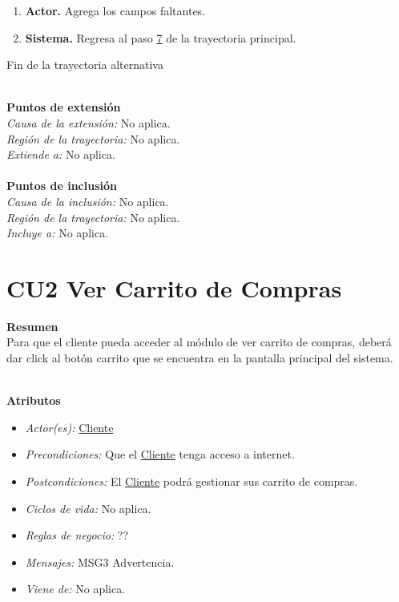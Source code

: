 \begin{itemize}
\begin{enumerate}
				\item \textbf{Actor.} Agrega los campos faltantes.
				
				\item \textbf{Sistema.} Regresa al paso \hyperlink{CU1:TP:P7}{7} de la trayectoria principal.
	
			\end{enumerate}
			
			Fin de la trayectoria alternativa
		

	\end{itemize}

	\noindent \textbf{\\Puntos de extensión}\\

		\noindent \textit{Causa de la extensión:} No aplica.\\
		\textit{Región de la trayectoria:} No aplica.\\
		\textit{Extiende a:} No aplica.\\

		
	\noindent \textbf{\\Puntos de inclusión}\\
	
		\noindent \textit{Causa de la inclusión:} No aplica.\\
		\textit{Región de la trayectoria:} No aplica.\\
		\textit{Incluye a:} No aplica.\\


\hypertarget{CU2}{}
\section{CU2 Ver Carrito de Compras}

\noindent \textbf{Resumen}\\

Para que el cliente pueda acceder al módulo de ver carrito de compras, deberá dar click al botón carrito que se encuentra en la pantalla principal del sistema.

\noindent \textbf{\\Atributos}

\begin{itemize}
	
	\item \textit{Actor(es):} \hyperlink{A:Cliente}{Cliente}
	\item \textit{Precondiciones:} Que el \hyperlink{A:Cliente}{Cliente} tenga acceso a internet. 
	\item \textit{Postcondiciones:} El \hyperlink{A:Cliente}{Cliente} podrá gestionar sus carrito de compras.
	\item \textit{Ciclos de vida:} No aplica. 
	\item \textit{Reglas de negocio:} ??
	\item \textit{Mensajes:} MSG3 Advertencia.
	\item \textit{Viene de:} No aplica.
	
\end{itemize} 
		
